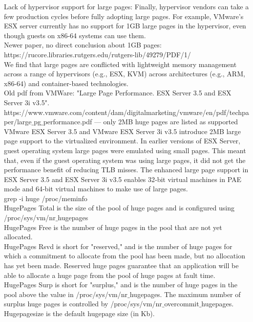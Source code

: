 \documentclass[11pt, a4paper, oneside]{article}
\theoremstyle{definition}
\begin{document}
    Lack of hypervisor support for large pages: Finally, hypervisor vendors can take a few production cycles before fully adopting large pages. For example, VMware’s ESX server currently has no support for 1GB large pages in the hypervisor, even though guests on x86-64 systems can use them.\\

    Newer paper, no direct conclusion about 1GB pages: https://rucore.libraries.rutgers.edu/rutgers-lib/49279/PDF/1/\\

    We find that large pages are conflicted with lightweight memory management across a range of hypervisors (e.g., ESX, KVM) across architectures (e.g., ARM, x86-64) and container-based technologies.\\

    Old pdf from VMWare: "Large Page Performance. ESX Server 3.5 and ESX Server 3i v3.5". https://www.vmware.com/content/dam/digitalmarketing/vmware/en/pdf/techpaper/large$\_$pg$\_$performance.pdf --- only 2MB huge pages are listed as supported\\

    VMware ESX Server 3.5 and VMware ESX Server 3i v3.5 introduce 2MB large page support to the virtualized environment. In earlier versions of ESX Server, guest operating system large pages were emulated using small pages. This meant that, even if the guest operating system was using large pages, it did not get the performance benefit of reducing TLB misses. The enhanced large page support in ESX Server 3.5 and ESX Server 3i v3.5 enables 32‐bit virtual machines in PAE mode and 64‐bit virtual machines to make use of large pages.\\

grep -i huge /proc/meminfo\\

HugePages Total is the size of the pool of huge pages and is configured 
				using /proc/sys/vm/nr$\_$hugepages\\
HugePages Free  is the number of huge pages in the pool that are not yet
                allocated.\\
HugePages Rsvd  is short for "reserved," and is the number of huge pages for
                which a commitment to allocate from the pool has been made,
                but no allocation has yet been made.  Reserved huge pages
                guarantee that an application will be able to allocate a
                huge page from the pool of huge pages at fault time.\\
HugePages Surp  is short for "surplus," and is the number of huge pages in
                the pool above the value in /proc/sys/vm/nr$\_$hugepages. The
                maximum number of surplus huge pages is controlled by
                /proc/sys/vm/nr$\_$overcommit$\_$hugepages.\\
Hugepagesize    is the default hugepage size (in Kb).\\
\end{document}
